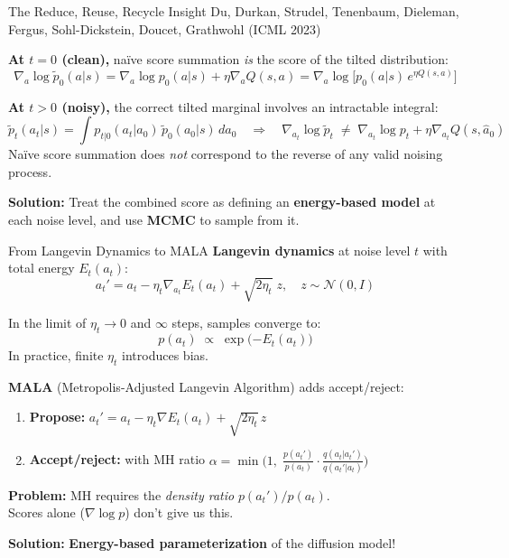 \documentclass[aspectratio=169,11pt]{beamer}
\begin{document}
\begin{frame}{The Reduce, Reuse, Recycle Insight}
{\small Du, Durkan, Strudel, Tenenbaum, Dieleman, Fergus, Sohl-Dickstein, Doucet, Grathwohl (ICML 2023)}

\pause
\medskip
\textbf{At $t=0$ (clean),} na\"ive score summation \emph{is} the score of the tilted distribution:
\[
  \nabla_a \log \tilde{p}_0(a|s) = \nabla_a \log p_0(a|s) + \eta \nabla_a Q(s,a) = \nabla_a \log\!\big[p_0(a|s)\,e^{\eta Q(s,a)}\big]
\]

\pause
\textbf{At $t > 0$ (noisy),} the correct tilted marginal involves an intractable integral:
\[
  \tilde{p}_t(a_t|s) = \int p_{t|0}(a_t | a_0)\, \tilde{p}_0(a_0|s)\, da_0
  \quad\Rightarrow\quad
  \nabla_{a_t}\!\log \tilde{p}_t \;\neq\; \nabla_{a_t}\!\log p_t + \eta\nabla_{a_t} Q(s,\hat{a}_0)
\]
Na\"ive score summation does \emph{not} correspond to the reverse of any valid noising process.

\pause
\medskip
\textbf{Solution:} Treat the combined score as defining an \textbf{energy-based model} at each noise level, and use \textbf{MCMC} to sample from it.

\pause
\smallskip
\begin{center}
\end{center}
\end{frame}

\begin{frame}{From Langevin Dynamics to MALA}
\textbf{Langevin dynamics} at noise level $t$ with total energy $E_t(a_t)$:
\[
  a_t' = a_t - \eta_t \nabla_{a_t} E_t(a_t) + \sqrt{2\eta_t}\; z, \quad z \sim \mathcal{N}(0,I)
\]

\pause
In the limit of $\eta_t \to 0$ and $\infty$ steps, samples converge to:
\[
  p(a_t) \;\propto\; \exp\!\big({-E_t(a_t)}\big)
\]
In practice, finite $\eta_t$ introduces bias.

\pause
\medskip
\textbf{MALA} (Metropolis-Adjusted Langevin Algorithm) adds accept/reject:
\begin{enumerate}\setlength\itemsep{3pt}
  \item \textbf{Propose:} $a_t' = a_t - \eta_t \nabla E_t(a_t) + \sqrt{2\eta_t}\, z$
  \item \textbf{Accept/reject:} with MH ratio $\alpha = \min\!\big(1,\; \frac{p(a_t')}{p(a_t)} \cdot \frac{q(a_t|a_t')}{q(a_t'|a_t)}\big)$
\end{enumerate}

\pause
\medskip
\textcolor{redaccent}{\textbf{Problem:}} MH requires the \emph{density ratio} $p(a_t')/p(a_t)$. \\
Scores alone ($\nabla \log p$) don't give us this.

\pause
\medskip
\textcolor{greenaccent}{\textbf{Solution:}} \textbf{Energy-based parameterization} of the diffusion model!
\end{frame}
\end{document}
